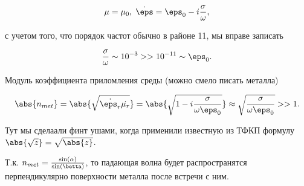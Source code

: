 $$\mu=\mu_0, \; \dot{\eps}=\eps_0-i\frac{\sigma}{\omega}, $$

с учетом того, что порядок частот обычно в районе 11, мы вправе записать

$$\frac{\sigma}{\omega} \sim 10^{-3} >> 10^{-11} \sim \eps_0. $$

Модуль коэффициента приломления среды (можно смело писать металла)

$$\abs{n_{met}}=\abs{\sqrt{\dot{\eps_r}\dot{\mu_r}}}=\abs{\sqrt{1-i\frac{\sigma}{\omega\eps_0}}} \approx 
\sqrt{\frac{\sigma}{\omega\eps_0}} >> 1.$$

Тут мы сделаали финт ушами, когда применили известную из ТФКП формулу $\abs{\sqrt{z}}=\sqrt{\abs{z}}$.

Т.к. $n_{met}=\frac{\sin(\alpha)}{\sin(\betta)}$, то падающая волна будет распространятся перпендикулярно
поверхности металла после встречи с ним.
